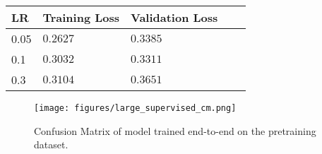 \documentclass[12pt,twoside]{report}
\begin{document}



\begin{table}[]
    \centering
    \begin{tabular}{lllll}
    \toprule
    LR & Training Loss & Validation Loss \\
    \midrule
    0.05 & $0.2627$ & $0.3385$\\
    0.1 & $0.3032$ & $0.3311$\\
    0.3 & $0.3104$ & $0.3651$\\
    \bottomrule
    \end{tabular}
    \captionsetup{type=table}
    \label{tab:large_supervised_tuning}
\end{table}


\begin{figure}
    \centering
    \texttt{[image: figures/large\_supervised\_cm.png]}
    \caption{Confusion Matrix of model trained end-to-end on the pretraining dataset.}
    \label{fig:large_supervised_cm}
\end{figure}
\end{document}
